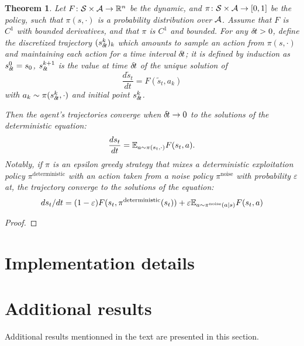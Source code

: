 \documentclass[11pt]{article}
\newtheorem{theorem}{Theorem}
\begin{document}
\begin{theorem}
  Let $F\colon {\cal S} \times {\cal A} \rightarrow \mathbb{R}^n$ be the dynamic, and $\pi\colon {\cal S} \times {\cal A} \rightarrow [0,1]$ be the policy, such that $\pi(s, \cdot)$ is a probability distribution over ${\cal A}$. Assume that 
  $F$ is $C^1$ with bounded derivatives, and that $\pi$ is $C^1$ and bounded.
  For any ${\delta\hspace{-.1em}t} > 0$, define the discretized trajectory
	$(s_{\delta\hspace{-.1em}t}^k)_k$ which amounts to sample an action from $\pi(s, \cdot)$ and maintaining each action for a
	time interval ${\delta\hspace{-.1em}t}$; it is defined by induction as $s_{\delta\hspace{-.1em}t}^0 = s_0$,
	$s_{\delta\hspace{-.1em}t}^{k + 1}$ is the value at time ${\delta\hspace{-.1em}t}$ of
	the unique solution of
	\begin{equation}
		\frac{d\tilde{s}_t}{dt} = F(\tilde{s}_t, a_k)
		\label{eq:diff_2}
	\end{equation}
	with $a_k \sim \pi(s_{\delta\hspace{-.1em}t}^k, \cdot)$ and initial point $s_{\delta\hspace{-.1em}t}^k$.

        Then the
        agent's trajectories converge when ${\delta\hspace{-.1em}t}\to 0$ to the solutions of the
        \emph{deterministic} equation:
        \begin{equation}
		\frac{ds_t}{dt} = \mathbb{E}_{a\sim \pi(s_t, \cdot)}F(s_t, a).
		\label{eq:diff}
              \end{equation}
              Notably, if $\pi$ is an epsilon greedy strategy that mixes a deterministic exploitation policy $\pi^{\text{deterministic}}$ with an action taken from a noise policy $\pi^{\text{noise}}$ with probability $\varepsilon$ at, the trajectory converge to the solutions of the equation: 
        \begin{equation}
          d s_t/dt= (1-\varepsilon) F(s_t,\pi^\text{deterministic}(s_t))+\varepsilon \mathbb{E}_{a\sim
            \pi^\text{noise}(a|s)}F(s_t,a)
	\end{equation}
\end{theorem}
\begin{proof}
	
\end{proof}
\section{Implementation details}

\section{Additional results}
Additional results mentionned in the text are presented in this section.

\end{document}
